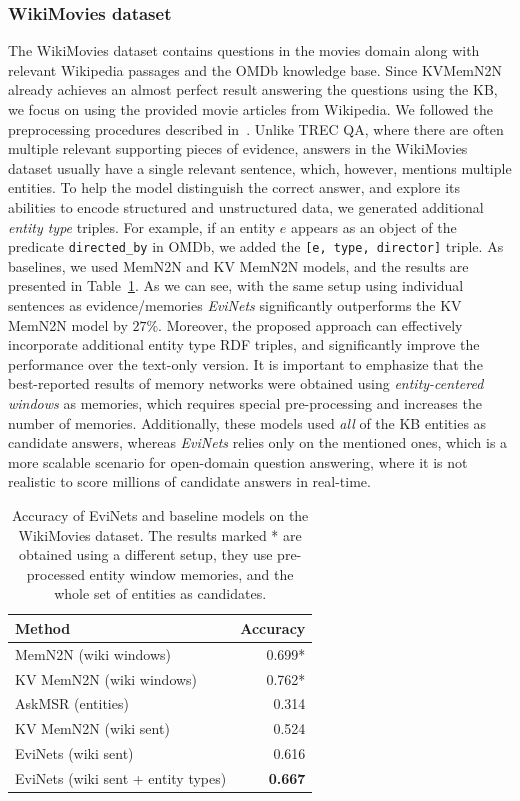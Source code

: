 \subsubsection{WikiMovies dataset}
\label{section:factoid:evinet:eval:wikimovies}

The WikiMovies dataset contains questions in the movies domain along with relevant Wikipedia passages and the OMDb knowledge base.
Since KVMemN2N already achieves an almost perfect result answering the questions using the KB, we focus on using the provided movie articles from Wikipedia.
We followed the preprocessing procedures described in~\cite{miller2016key}.
Unlike TREC QA, where there are often multiple relevant supporting pieces of evidence, answers in the WikiMovies dataset usually have a single relevant sentence, which, however, mentions multiple entities.
To help the model distinguish the correct answer, and explore its abilities to encode structured and unstructured data, we generated additional \textit{entity type} triples.
For example, if an entity $e$ appears as an object of the predicate \texttt{directed\_by} in OMDb, we added the \texttt{[e, type, director]} triple.
As baselines, we used MemN2N and KV MemN2N models, and the results are presented in Table~\ref{section:factoid:evinet:eval:wikimovies}.
As we can see, with the same setup using individual sentences as evidence/memories \textit{EviNets} significantly outperforms the KV MemN2N model by $27\%$.
Moreover, the proposed approach can effectively incorporate additional entity type RDF triples, and significantly improve the performance over the text-only version.
It is important to emphasize that the best-reported results of memory networks were obtained using \textit{entity-centered windows} as memories, which requires special pre-processing and increases the number of memories.
Additionally, these models used \textit{all} of the KB entities as candidate answers, whereas \textit{EviNets} relies only on the mentioned ones, which is a more scalable scenario for open-domain question answering, where it is not realistic to score millions of candidate answers in real-time.

\begin{table}
\centering
\begin{tabular}{lr}
Method & Accuracy \\
\hline
MemN2N (wiki windows) & 0.699* \\
KV MemN2N (wiki windows) & 0.762* \\
\hline
AskMSR (entities) & 0.314 \\
KV MemN2N (wiki sent) & 0.524 \\
EviNets (wiki sent) & 0.616  \\
EviNets (wiki sent + entity types) & \textbf{0.667} \\
\end{tabular}
\caption{Accuracy of EviNets and baseline models on the WikiMovies dataset. The results marked * are obtained using a different setup, \ie they use pre-processed entity window memories, and the whole set of entities as candidates.}
\label{section:factoid:evinet:eval:wikimovies}
\end{table}

